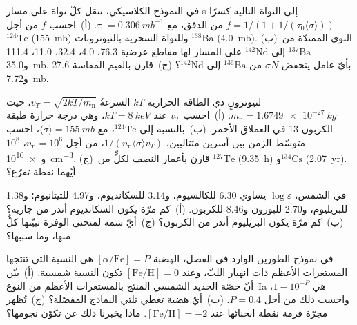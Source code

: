 \begin{exercise}[$\star\star$]\label{exo:b3:origin-of-elements:6}
في النموذج الكلاسيكي، تنقل كلّ نواة على مسار s إلى
النواة التالية كسرًا $f = 1/(1 + 1/(\tau_0\langle\sigma\rangle))$ من
الدفق، مع $\tau_0 = \qty{0.306}{mb^{-1}}$. (أ)~احسب $f$ من أجل
$^{124}\mathrm{Te}$ (\qty{155}{mb}) وللنواة السحرية بالنيوترونات
$^{138}\mathrm{Ba}$ (\qty{4.0}{mb}). (ب)~النوى الممتدّة من
$^{137}\mathrm{Ba}$ إلى $^{142}\mathrm{Nd}$ على المسار لها مقاطع عرضية
\num{76.3}، \num{4.0}، \num{32.4}، \num{11.0}،
\num{111.4} و\qty{35.0}{mb}. بأيّ عامل ينخفض $\sigma N$ من
$^{136}\mathrm{Ba}$ إلى $^{142}\mathrm{Nd}$؟ (ج)~قارن بالقيم
المقاسة \num{27.6} و\qty{7.72}{mb}.
\end{exercise}

\begin{exercise}[$\star\star$]\label{exo:b3:origin-of-elements:7}
لنيوترونٍ ذي الطاقة الحرارية $kT$ السرعةُ
$v_T = \sqrt{2kT/m_\mathrm{n}}$، حيث $m_\mathrm{n} = \qty{1.6749e-27}{kg}$.
(أ)~احسب $v_T$ عند $kT = \qty{8}{keV}$، وهي درجة حرارة
طبقة الكربون-13 في العملاق الأحمر. (ب)~بالنسبة إلى $^{124}\mathrm{Te}$، مع
$\langle\sigma\rangle = \qty{155}{mb}$، احسب متوسّط الزمن بين
أسرين متتاليين، $1/(n_\mathrm{n}\langle\sigma\rangle v_T)$، من أجل
$n_\mathrm{n} = 10^6$، $10^8$ و\qty{e10}{cm^{-3}}. (ج)~قارن بأعمار النصف لكلٍّ من
$^{127}\mathrm{Te}$ (\qty{9.35}{h})
و$^{134}\mathrm{Cs}$ (\qty{2.07}{yr}). أيّهما نقطة تفرّع؟
\end{exercise}

\begin{exercise}[$\star\star$]\label{exo:b3:origin-of-elements:8}
في الشمس، $\log\varepsilon$ يساوي \num{6.30} للكالسيوم، و\num{3.14}
للسكانديوم، و\num{4.97} للتيتانيوم؛ و\num{1.38} للبريليوم،
و\num{2.70} للبورون و\num{8.46} للكربون. (أ)~كم مرّة يكون السكانديوم أندر
من جاريه؟ (ب)~كم مرّة يكون
البريليوم أندر من الكربون؟ (ج)~أيّ سمة لمنحنى الوفرة تبيّنها
كلٌّ منها، وما سببها؟
\end{exercise}

\begin{exercise}[$\star\star$]\label{exo:b3:origin-of-elements:9}
في نموذج الطورين الوارد في الفصل، الهضبة
$[\alpha/\mathrm{Fe}] = P$ هي النسبة التي تنتجها المستعرات الأعظم ذات انهيار اللبّ،
وعند $[\mathrm{Fe/H}] = 0$ تكون النسبة شمسية. (أ)~بيّن أنّ حصّة
الحديد الشمسي المنتَج بالمستعرات الأعظم من النوع~Ia هي $1 - 10^{-P}$،
واحسب ذلك من أجل $P = 0.4$. (ب)~أيّ هضبة تعطي ثلثي
النماذج المفصّلة؟ (ج)~تُظهر مجرّة قزمة نقطة انحنائها عند
$[\mathrm{Fe/H}] = -2$. ماذا يخبرنا ذلك عن تكوّن نجومها؟
\end{exercise}

